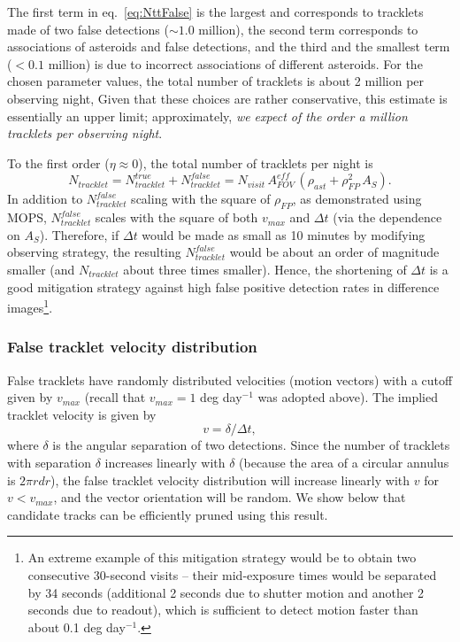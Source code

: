 The first term in eq.~\ref{eq:NttFalse} is the largest and corresponds to tracklets made of two false 
detections ($\sim1.0$ million), the second term corresponds to associations of asteroids and false detections,
and the third and the smallest term ($<0.1$ million) is due to incorrect associations of different asteroids.
For the chosen parameter values, the total number of tracklets is about 2 million per observing night, Given that 
these choices are rather conservative, this estimate is essentially an upper limit; approximately, 
{\it we expect of the order a million tracklets per observing night}. 

To the first order ($\eta \approx 0$), the total number of tracklets per night is
\begin{equation}
    N_{tracklet} =  N_{tracklet}^{true} + N_{tracklet}^{false} = 
       N_{visit} \, A_{FOV}^{eff} \, \left(\rho_{ast}  + \rho^2_{FP}  \, A_S \right). 
\end{equation}
In addition to $N_{tracklet}^{false}$ scaling with the square of $\rho_{FP}$, as demonstrated using MOPS,
$N_{tracklet}^{false}$ scales with the square of
both $v_{max}$ and  $\Delta t$ (via the dependence on $A_S$). Therefore, if $\Delta t$ would be made
as small as 10 minutes by modifying observing strategy, the resulting $N_{tracklet}^{false}$ would be about an 
order of magnitude smaller (and $N_{tracklet}$ about three times smaller).  Hence, the shortening of $\Delta t$ is 
a good mitigation strategy against high false positive detection rates in difference images\footnote{An
extreme example of this mitigation strategy would be to obtain two consecutive 30-second visits -- their
mid-exposure times would be separated by 34 seconds (additional 2 seconds due to shutter motion and another 
2 seconds due to readout), which is sufficient to detect motion faster than about 0.1 deg day$^{-1}$.}. 


\subsubsection{False tracklet velocity distribution \label{sec:falsev}} 

False tracklets have randomly distributed velocities (motion vectors) with a cutoff given by $v_{max}$
(recall that $v_{max} = 1$ deg day$^{-1}$ was adopted above). The implied tracklet velocity is given by 
\begin{equation}
                       v =  \delta / \Delta t, 
\end{equation}
where $\delta$ is the angular separation of two detections. Since the number of tracklets
with separation $\delta$ increases linearly with $\delta$ (because the area of a circular
annulus is $2\pi r dr$), the false tracklet velocity distribution will increase linearly with
$v$ for $v<v_{max}$, and the vector orientation will be random. We show below that candidate
tracks can be efficiently pruned using this result. 



